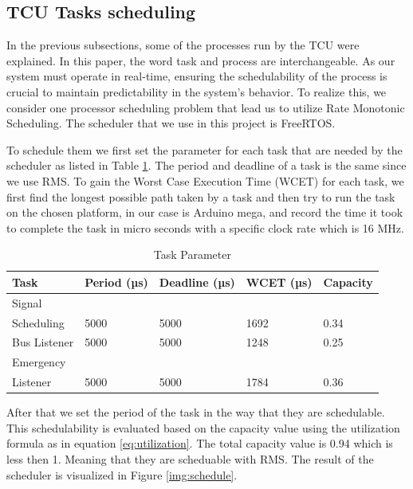 \subsection{TCU Tasks scheduling }
\label{subsec:task_scheduling} 

In the previous subsections, some of the processes run by the TCU were explained. In this paper, the word task and process are interchangeable. As our system must operate in real-time, ensuring the schedulability of the process is crucial to maintain predictability in the system's behavior. To realize this, we consider one processor scheduling problem that lead us to utilize Rate Monotonic Scheduling. The scheduler that we use in this project is FreeRTOS.

To schedule them we first set the parameter for each task that are needed by the scheduler as listed in Table \ref{tab:task_parameter}. The period and deadline of a task is the same since we use RMS. To gain the Worst Case Execution Time (WCET) for each task, we first find the longest possible path taken by a task and then try to run the task on the chosen platform, in our case is Arduino mega, and record the time it took to complete the task in micro seconds with a specific clock rate which is 16 MHz. 

\begin{table}
\centering
\caption{Task Parameter}
\begin{tabular}{|l|l|l|l|l|} 
\hline
Task                 & Period (µs) & Deadline (µs) & WCET (µs) & Capacity  \\ 
\hline
Signal &&&& \\
Scheduling  & 5000        & 5000          & 1692      & 0.34      \\ 
\hline
Bus Listener         & 5000        & 5000          & 1248      & 0.25      \\ 
\hline
Emergency &&&& \\
Listener & 5000        & 5000          & 1784      & 0.36      \\
\hline
\end{tabular}
\label{tab:task_parameter}
\end{table}


After that we set the period of the task in the way that they are schedulable. This schedulability is evaluated based on the capacity value using the utilization formula as in equation \ref{eq:utilization}. The total capacity value is 0.94 which is less then 1. Meaning that they are scheduable with RMS. The result of the scheduler is visualized in Figure \ref{img:schedule}.


